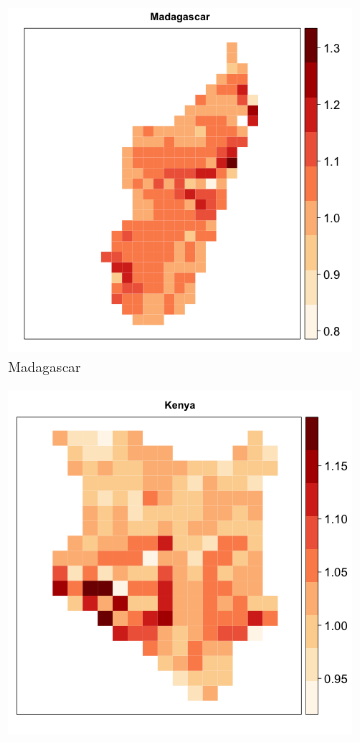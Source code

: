 \documentclass[11pt, oneside]{article}   	%
\begin{document}
\begin{figure}[t]
\begin{subfigure}[c]{0.32\textwidth}
\includegraphics[width=\textwidth]{../../Analysis/output/zeta_heatmaps/Madagascar_zeta.png}
\caption{Madagascar}
\label{fig:Madagascar_zeta}
\end{subfigure}
\begin{subfigure}[c]{0.32\textwidth}
\includegraphics[width=\textwidth]{../../Analysis/output/zeta_heatmaps/Kenya_zeta.png}

\end{subfigure}
\end{figure}
\end{document}
